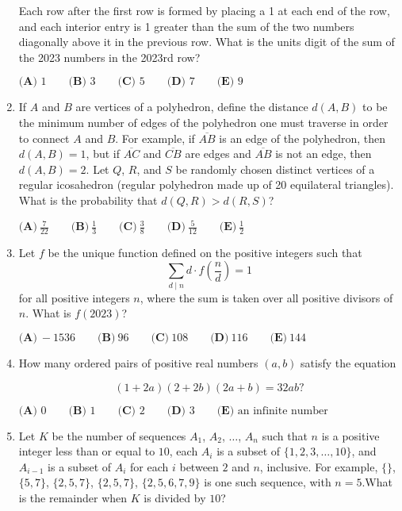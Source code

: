 \documentclass{article}
\begin{document}
\begin{enumerate}[label=\arabic*., itemsep=0.5em]
Each row after the first row is formed by placing a 1 at each end of the row, and each interior entry is 1 greater than the sum of the two numbers diagonally above it in the previous row. What is the units digit of the sum of the 2023 numbers in the 2023rd row?

$\textbf{(A) }1\qquad\textbf{(B) }3\qquad\textbf{(C) }5\qquad\textbf{(D) }7\qquad\textbf{(E) }9$\par \vspace{0.5em}\item If $A$ and $B$ are vertices of a polyhedron, define the distance $d(A, B)$ to be the minimum number of edges of the polyhedron one must traverse in order to connect $A$ and $B$. For example, if $\overline{AB}$ is an edge of the polyhedron, then $d(A, B) = 1$, but if $\overline{AC}$ and $\overline{CB}$ are edges and $\overline{AB}$ is not an edge, then $d(A, B) = 2$. Let $Q$, $R$, and $S$ be randomly chosen distinct vertices of a regular icosahedron (regular polyhedron made up of 20 equilateral triangles). What is the probability that $d(Q, R) > d(R, S)$?

$\textbf{(A)}~\frac{7}{22}\qquad\textbf{(B)}~\frac13\qquad\textbf{(C)}~\frac38\qquad\textbf{(D)}~\frac5{12}\qquad\textbf{(E)}~\frac12$\par \vspace{0.5em}\item Let $f$ be the unique function defined on the positive integers such that
\begin{equation*}
\sum_{d\mid n}d\cdot f\left(\frac{n}{d}\right)=1
\end{equation*}
for all positive integers $n$, where the sum is taken over all positive divisors of $n$. What is $f(2023)$?

$\textbf{(A)}~-1536\qquad\textbf{(B)}~96\qquad\textbf{(C)}~108\qquad\textbf{(D)}~116\qquad\textbf{(E)}~144$\par \vspace{0.5em}\item How many ordered pairs of positive real numbers $(a,b)$ satisfy the equation

\begin{equation*}
(1+2a)(2+2b)(2a+b) = 32ab?
\end{equation*}


$\textbf{(A) }0\qquad\textbf{(B) }1\qquad\textbf{(C) }2\qquad\textbf{(D) }3\qquad\textbf{(E) }\text{an infinite number}$\par \vspace{0.5em}\item Let $K$ be the number of sequences $A_1$, $A_2$, $\dots$, $A_n$ such that $n$ is a positive integer less than or equal to $10$, each $A_i$ is a subset of $\{1, 2, 3, \dots, 10\}$, and $A_{i-1}$ is a subset of $A_i$ for each $i$ between $2$ and $n$, inclusive. For example, $\{\}$, $\{5, 7\}$, $\{2, 5, 7\}$, $\{2, 5, 7\}$, $\{2, 5, 6, 7, 9\}$ is one such sequence, with $n = 5$.What is the remainder when $K$ is divided by $10$?


\end{enumerate}
\end{document}
